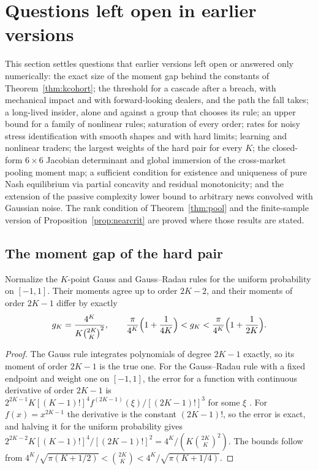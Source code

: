 \section{Questions left open in earlier versions}\label{app:openres}

This section settles questions that earlier versions left open or answered only numerically: the exact size of the moment gap behind the constants of Theorem~\ref{thm:kcohort}; the threshold for a cascade after a breach, with mechanical impact and with forward-looking dealers, and the path the fall takes; a long-lived insider, alone and against a group that chooses its rule; an upper bound for a family of nonlinear rules; saturation of every order; rates for noisy stress identification with smooth shapes and with hard limits; learning and nonlinear traders; the largest weights of the hard pair for every $K$; the closed-form $6\times6$ Jacobian determinant and global immersion of the cross-market pooling moment map; a sufficient condition for existence and uniqueness of pure Nash equilibrium via partial concavity and residual monotonicity; and the extension of the passive complexity lower bound to arbitrary news convolved with Gaussian noise. The rank condition of Theorem~\ref{thm:pool} and the finite-sample version of Proposition~\ref{prop:nearcrit} are proved where those results are stated.

\subsection{The moment gap of the hard pair}

\begin{proposition}\label{prop:gap}
Normalize the $K$-point Gauss and Gauss--Radau rules for the uniform probability on $[-1,1]$. Their moments agree up to order $2K-2$, and their moments of order $2K-1$ differ by exactly
\[
g_K=\frac{4^K}{K\binom{2K}{K}^2},\qquad \frac{\pi}{4^K}\Bigl(1+\frac1{4K}\Bigr)<g_K<\frac{\pi}{4^K}\Bigl(1+\frac1{2K}\Bigr).
\]
\end{proposition}

\begin{proof}
The Gauss rule integrates polynomials of degree $2K-1$ exactly, so its moment of order $2K-1$ is the true one. For the Gauss--Radau rule with a fixed endpoint and weight one on $[-1,1]$, the error for a function with continuous derivative of order $2K-1$ is $2^{2K-1}K[(K-1)!]^4f^{(2K-1)}(\xi)/[(2K-1)!]^3$ for some $\xi$ \citep[25.4.31]{abramowitz1964}. For $f(x)=x^{2K-1}$ the derivative is the constant $(2K-1)!$, so the error is exact, and halving it for the uniform probability gives $2^{2K-2}K[(K-1)!]^4/[(2K-1)!]^2=4^K/(K\binom{2K}{K}^2)$. The bounds follow from $4^K/\sqrt{\pi(K+1/2)}<\binom{2K}{K}<4^K/\sqrt{\pi(K+1/4)}$.
\end{proof}

